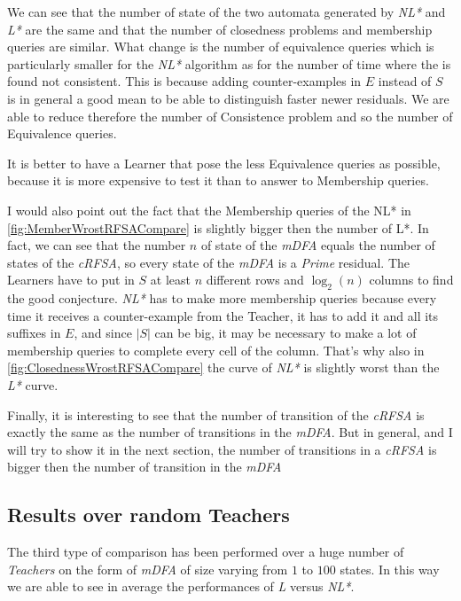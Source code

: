 We can see that the number of state of the two automata generated by \textit{NL*} and \textit{L*} are the same and that the number of closedness problems and membership queries are similar. What change is the number of equivalence queries which is particularly smaller for the \textit{NL*} algorithm as for the number of time where the \OT is found not consistent. This is because adding counter-examples in $E$ instead of $S$ is in general a good mean to be able to distinguish faster newer residuals. We are able to reduce therefore the number of Consistence problem and so the number of Equivalence queries.

\begin{remark}
  It is better to have a Learner that pose the less Equivalence queries as possible, because it is more expensive to test it than to answer to Membership queries.
\end{remark}

I would also point out the fact that the Membership queries of the NL* in \cref{fig:MemberWrostRFSACompare} is slightly bigger then the number of L*. In fact, we can see that the number $n$ of state of the \textit{mDFA} equals the number of states of the \textit{cRFSA}, so every state of the \textit{mDFA} is a \textit{Prime} residual. The Learners have to put in $S$ at least $n$ different rows and $\log_2(n)$ columns to find the good conjecture. \textit{NL*} has to make more membership queries because every time it receives a counter-example from the Teacher, it has to add it and all its suffixes in $E$, and since $|S|$ can be big, it may be necessary to make a lot of membership queries to complete every cell of the column. That's why also in \cref{fig:ClosednessWrostRFSACompare} the curve of \textit{NL*} is slightly worst than the \textit{L*} curve.

Finally, it is interesting to see that the number of transition of the \textit{cRFSA} is exactly the same as the number of transitions in the \textit{mDFA}. But in general, and I will try to show it in the next section, the number of transitions in a \textit{cRFSA} is bigger then the number of transition in the \textit{mDFA}

\subsection{Results over random Teachers}

The third type of comparison has been performed over a huge number of \textit{Teachers} on the form of \textit{mDFA} of size varying from $1$ to $100$ states. In this way we are able to see in average the performances of \textit{L} versus \textit{NL*}.

